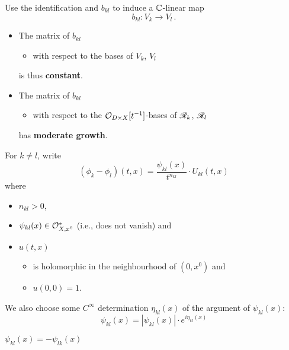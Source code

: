 Use the identification and $b_{kl}$ to induce a $\mathbb{C}$-linear map
\[
  b_{kl}:V_k\to V_l \,.
\]
\begin{rem}
  \begin{itemize}
    \item The matrix of $b_{kl}$
      \begin{itemize}
        \item with respect to the bases of $V_k$, $V_l$
      \end{itemize}
      is thus \textbf{constant}.
    \item The matrix of $b_{kl}$
      \begin{itemize}
        \item with respect to the $\mathcal{O}_{D\times X}[t^{-1}]$-bases of $\mathscr{R}_k$,
          $\mathscr{R}_l$
      \end{itemize}
      has \textbf{moderate growth}.
  \end{itemize}
\end{rem}
For $k\neq l$, write
\[
  (\phi_k-\phi_l)(t,x)=\frac{\psi_{kl}(x)}{t^{n_{kl}}}\cdot U_{kl}(t,x)
\]
where
\begin{itemize}
  \item $n_{kl}>0$,
  \item $\psi_{kl}(x)\in\mathcal{O}_{X,x^0}^*$ (i.e., does not vanish) and
  \item $u(t,x)$
    \begin{itemize}
      \item is holomorphic in the neighbourhood of $(0,x^0)$ and
      \item $u(0,0)=1$.
    \end{itemize}
\end{itemize}
We also choose some $C^\infty$ determination $\eta_{kl}(x)$ of the argument of
$\psi_{kl}(x)$:
\[
  \psi_{kl}(x)=|\psi_{kl}(x)|\cdot e^{i\eta_{kl}(x)}
\]
\begin{rem}
  $\psi_{kl}(x)=-\psi_{lk}(x)$
\end{rem}
